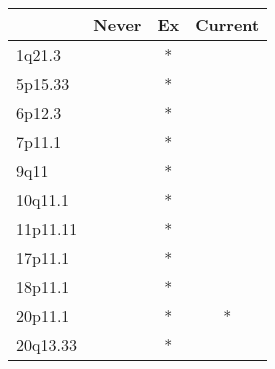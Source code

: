\begin{tabular}{lccc}
\toprule
{} & Never & Ex & Current \\
\midrule
1q21.3   &       &  * &         \\
5p15.33  &       &  * &         \\
6p12.3   &       &  * &         \\
7p11.1   &       &  * &         \\
9q11     &       &  * &         \\
10q11.1  &       &  * &         \\
11p11.11 &       &  * &         \\
17p11.1  &       &  * &         \\
18p11.1  &       &  * &         \\
20p11.1  &       &  * &       * \\
20q13.33 &       &  * &         \\
\bottomrule
\end{tabular}
